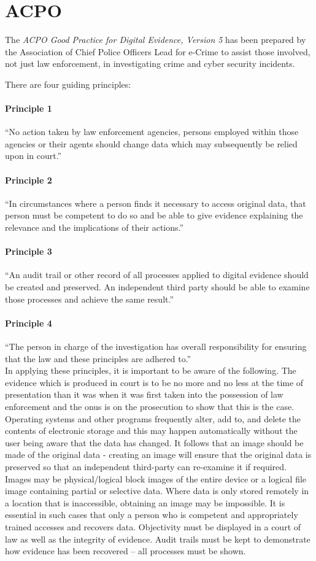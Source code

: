 \section{ACPO}
The \textit{ACPO Good Practice for Digital Evidence, Version 5} has been prepared by the Association of Chief Police Officers Lead for e-Crime to assist those involved, not just law enforcement, in investigating crime and cyber security incidents.

There are four guiding principles:
\paragraph{Principle 1}
``No action taken by law enforcement agencies, persons employed within those agencies or their agents should change data which may subsequently be relied upon in court.''
\paragraph{Principle 2}
``In circumstances where a person finds it necessary to access original data, that person must be competent to do so and be able to give evidence explaining the relevance and the implications of their actions.''
\paragraph{Principle 3}
``An audit trail or other record of all processes applied to digital evidence should be created and preserved. An independent third party should be able to examine those processes and achieve the same result.''
\paragraph{Principle 4}
``The person in charge of the investigation has overall responsibility for ensuring that the law and these principles are adhered to.''\\

In applying these principles, it is important to be aware of the following. The evidence which is produced in court is to be no more and no less at the time of presentation than it was when it was first taken into the possession of law enforcement and the onus is on the prosecution to show that this is the case. Operating systems and other programs frequently alter, add to, and delete the contents of electronic storage and this may happen automatically without the user being aware that the data has changed. It follows that an image should be made of the original data - creating an image will ensure that the original data is preserved so that an independent third-party can re-examine it if required. Images may be physical/logical block images of the entire device or a logical file image containing partial or selective data. Where data is only stored remotely in a location that is inaccessible, obtaining an image may be impossible. It is essential in such cases that only a person who is competent and appropriately trained accesses and recovers data. Objectivity must be displayed in a court of law as well as the integrity of evidence. Audit trails must be kept to demonstrate how evidence has been recovered -- all processes must be shown.
\pagebreak
